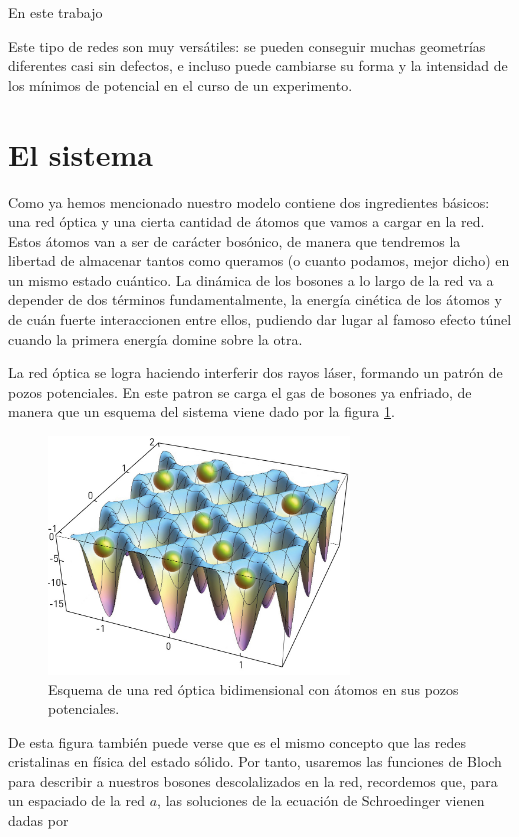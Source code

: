 \documentclass[11pt,a4paper]{article}
\begin{document}
En este  trabajo


Este tipo de redes son muy versátiles: se pueden conseguir muchas geometrías diferentes casi sin defectos, e incluso puede cambiarse su forma y la intensidad de los mínimos de potencial en el curso de un experimento. 


\section{El sistema}

Como ya hemos mencionado nuestro modelo contiene dos ingredientes básicos: una red óptica y una cierta cantidad de átomos que vamos a cargar en la red. Estos átomos van a ser de carácter bosónico, de manera que tendremos la libertad de almacenar tantos como queramos (o cuanto podamos, mejor dicho) en un mismo estado cuántico. La dinámica de los bosones a lo largo de la red va a depender de dos términos fundamentalmente, la energía cinética de los átomos y de cuán fuerte interaccionen entre ellos, pudiendo dar lugar al famoso efecto túnel cuando la primera energía domine sobre la otra.



La red óptica se logra haciendo interferir dos rayos láser, formando un patrón de pozos potenciales. En este patron se carga el gas de bosones ya enfriado, de manera que un esquema del sistema viene dado por la figura \ref{f:red}.

\begin{figure}[h]
  \centering
  \includegraphics[width=8cm]{hi_8148.jpg}
  \caption{Esquema de una red óptica bidimensional con átomos en sus pozos potenciales.}
  \label{f:red}
\end{figure}
\noindent

De esta figura también puede verse que es el mismo concepto que las redes cristalinas en física del estado sólido. Por tanto, usaremos las funciones de Bloch para describir a nuestros bosones descolalizados en la red, recordemos que, para un espaciado de la red $a$, las soluciones de la ecuación de Schroedinger vienen dadas por
\end{document}
